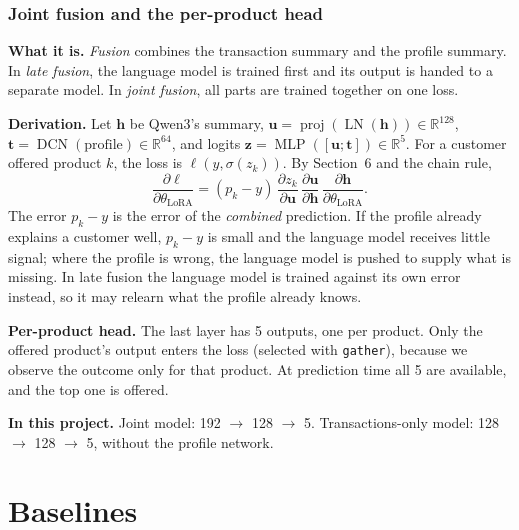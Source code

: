 \documentclass[10pt,a4paper]{article}
\newcommand{\what}[1]{\par\textbf{What it is.} #1}
\newcommand{\here}[1]{\par\textbf{In this project.} #1}
\newcommand{\deriv}{\par\textbf{Derivation.} }
\begin{document}
\section{Joint fusion and the per-product head}
\what{\emph{Fusion} combines the transaction summary and the profile summary. In \emph{late fusion}, the language model is trained first and its output is handed to a separate model. In \emph{joint fusion}, all parts are trained together on one loss.}
\deriv Let $\mathbf{h}$ be Qwen3's summary, $\mathbf{u}=\operatorname{proj}(\operatorname{LN}(\mathbf{h}))\in\mathbb{R}^{128}$, $\mathbf{t}=\operatorname{DCN}(\text{profile})\in\mathbb{R}^{64}$, and logits $\mathbf{z}=\operatorname{MLP}([\mathbf{u};\mathbf{t}])\in\mathbb{R}^5$. For a customer offered product $k$, the loss is $\ell(y,\sigma(z_k))$. By Section~6 and the chain rule,
\[\frac{\partial\ell}{\partial\theta_{\text{LoRA}}}=(p_k-y)\,\frac{\partial z_k}{\partial\mathbf{u}}\,\frac{\partial\mathbf{u}}{\partial\mathbf{h}}\,\frac{\partial\mathbf{h}}{\partial\theta_{\text{LoRA}}}.\]
The error $p_k-y$ is the error of the \emph{combined} prediction. If the profile already explains a customer well, $p_k-y$ is small and the language model receives little signal; where the profile is wrong, the language model is pushed to supply what is missing. In late fusion the language model is trained against its own error instead, so it may relearn what the profile already knows.

\textbf{Per-product head.} The last layer has 5 outputs, one per product. Only the offered product's output enters the loss (selected with \texttt{gather}), because we observe the outcome only for that product. At prediction time all 5 are available, and the top one is offered.
\here{Joint model: 192 $\to$ 128 $\to$ 5. Transactions-only model: 128 $\to$ 128 $\to$ 5, without the profile network.}

\part{Baselines}
\end{document}
